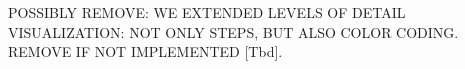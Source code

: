 \documentclass[review,journal]{vgtc}         %
\begin{document}
	POSSIBLY REMOVE: WE EXTENDED LEVELS OF DETAIL VISUALIZATION: NOT ONLY STEPS, BUT ALSO COLOR CODING. REMOVE IF NOT IMPLEMENTED [Tbd].
	
	
	
	
	
	
	
	
\end{document}
